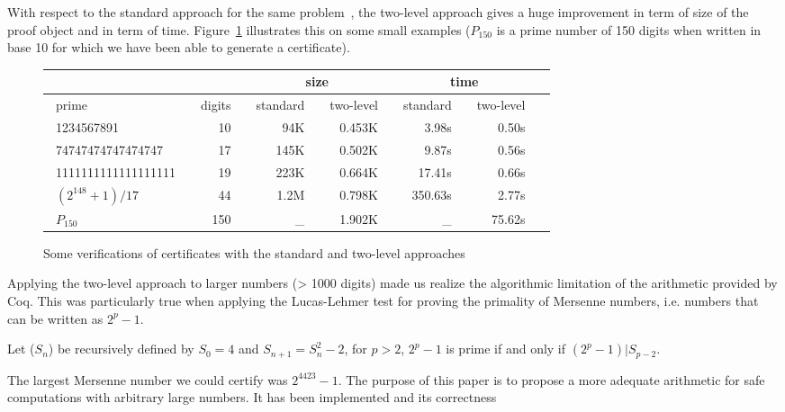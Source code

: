 With respect to the standard approach for the same problem~\cite{Caprotti_Oostdijk:01pockjsc}, the two-level
approach gives a huge improvement in term of size of the
proof object and in term of time.  Figure~\ref{fig:TimeComp} illustrates this
on some small examples ($P_{150}$ is a prime number of 150 digits when written
in base 10 for which we have been able to generate a certificate).
\begin{figure}
\begin{center}
\begin{tabular}{|l|r|r|r|r|r|r|}
\cline{3-6}
\multicolumn{2}{c}{} & \multicolumn{2}{|c|}{size} &
                                               \multicolumn{2}{c|}{time} \\
\hline
~prime     ~     & \multicolumn{1}{c|}{~digits~ } & ~standard~  &
  \multicolumn{1}{c|}{ ~two-level~ } &
  \multicolumn{1}{c|}{ ~standard~ } &
  \multicolumn{1}{c|}{ ~two-level~ } \\
\hline
~1234567891       ~   & 10~ &  94K~ &  ~0.453K~ & 3.98s~  & 0.50s~  \\
~74747474747474747~   & 17~ & 145K~ &  0.502K~ &   9.87s~ & 0.56s~ \\
~1111111111111111111~ & 19~ & 223K~ &  0.664K~ & 17.41s~  & 0.66s~   \\
~$(2^{148}+1)/17$ ~   & 44~ & 1.2M~ & 0.798K~ & ~350.63s~  & 2.77s~   \\
~$P_{150}$   ~        &150~ &  \_~  & 1.902K~   &  \_~   & 75.62s~  \\
\hline
\end{tabular}
\end{center}
\caption{Some verifications of certificates with the standard and two-level approaches}
\label{fig:TimeComp}
\end{figure} 
Applying the two-level approach to larger numbers (> 1000 digits) made us realize
the algorithmic limitation of the arithmetic provided by {\sc Coq}.
This was particularly true when applying the Lucas-Lehmer test
for proving the primality of Mersenne numbers, i.e. numbers that can be written as $2 ^ p -1$.
\begin{theorem}\label{lucas}
Let ($S_n$) be recursively defined by $S_0= 4$ and $S_{n+1} = S_n^2 - 2$,
for $p > 2$, $2^p-1$ is prime if and only if $(2^p -1) | S_{p-2}$.
\end{theorem}
The largest Mersenne number we could certify was $2^{4423} - 1$. 
The purpose of this paper is to propose a more adequate arithmetic for safe 
computations with arbitrary large numbers. It has been implemented and its correctness
